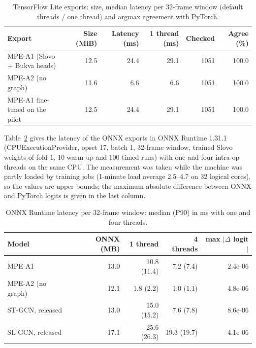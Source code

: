 \documentclass[a4paper,10pt]{article}
\begin{document}
\begin{table}[H]
\caption{TensorFlow Lite exports: size, median latency per 32-frame window (default threads / one thread) and argmax agreement with PyTorch.}\label{tab:s_tflite}
\centering
\footnotesize
\begin{tabular}{lrrrrr}
\toprule
\textbf{Export} & \textbf{Size (MiB)} & \textbf{Latency (ms)} & \textbf{1 thread (ms)} & \textbf{Checked} & \textbf{Agree (\%)} \\
\midrule
MPE-A1 (Slovo + Bukva heads) & 12.5 & 24.4 & 29.1 & 1051 & 100.0 \\
MPE-A2 (no graph) & 11.6 & 6.6 & 6.6 & 1051 & 100.0 \\
MPE-A1 fine-tuned on the pilot & 12.5 & 24.4 & 29.1 & 1051 & 100.0 \\
\bottomrule
\end{tabular}
\end{table}
Table~\ref{tab:s_ort} gives the latency of the ONNX exports in ONNX Runtime 1.31.1 (CPUExecutionProvider, opset 17, batch 1, 32-frame window, trained Slovo weights of fold 1, 10 warm-up and 100 timed runs) with one and four intra-op threads on the same CPU. The measurement was taken while the machine was partly loaded by training jobs (1-minute load average 2.5--4.7 on 32 logical cores), so the values are upper bounds; the maximum absolute difference between ONNX and PyTorch logits is given in the last column.
\begin{table}[H]
\caption{ONNX Runtime latency per 32-frame window: median (P90) in ms with one and four threads.}\label{tab:s_ort}
\centering
\footnotesize
\begin{tabular}{lrrrr}
\toprule
\textbf{Model} & \textbf{ONNX (MB)} & \textbf{1 thread} & \textbf{4 threads} & \textbf{max $|\Delta$ logit$|$} \\
\midrule
MPE-A1 & 13.0 & 10.8 (11.4) & 7.2 (7.4) & 2.4e-06 \\
MPE-A2 (no graph) & 12.1 & 1.8 (2.2) & 1.0 (1.1) & 4.8e-06 \\
ST-GCN, released & 13.0 & 15.0 (15.2) & 7.6 (7.8) & 8.6e-06 \\
SL-GCN, released & 17.1 & 25.6 (26.3) & 19.3 (19.7) & 4.1e-06 \\
\bottomrule
\end{tabular}
\end{table}
\end{document}

